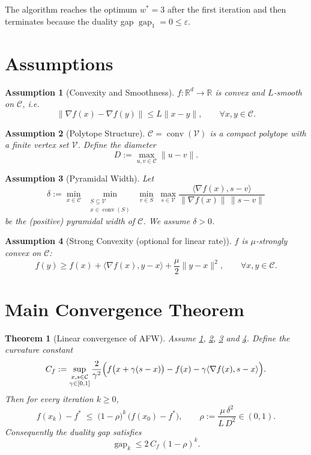 \documentclass{article}
\newtheorem{theorem}{Theorem}
\newtheorem{assumption}{Assumption}
\newcommand{\R}{\mathbb{R}}
\newcommand{\C}{\mathcal{C}}
\newcommand{\V}{\mathcal{V}}
\newcommand{\gap}{\operatorname{gap}}
\begin{document}
The algorithm reaches the optimum $w^{*}=3$ after the first iteration and then terminates because the duality gap $\gap_{1}=0\le\varepsilon$.

\section*{Assumptions}
\begin{assumption}[Convexity and Smoothness]\label{ass:conv-smooth}
$f:\R^{d}\rightarrow\R$ is convex and $L$‑smooth on $\C$, i.e.
\[
\|\nabla f(x)-\nabla f(y)\|\le L\|x-y\|,\qquad \forall x,y\in\C .
\]
\end{assumption}
\begin{assumption}[Polytope Structure]\label{ass:polytope}
$\C=\operatorname{conv}(\V)$ is a compact polytope with a finite vertex set $\V$.
Define the \emph{diameter}
\[
D:=\max_{u,v\in\C}\|u-v\| .
\]
\end{assumption}
\begin{assumption}[Pyramidal Width]\label{ass:pyr}
Let 
\[
\delta:=\min_{x\in\C}\;\min_{\substack{S\subseteq\V\\ x\in\operatorname{conv}(S)}}\;
\min_{v\in S}\;\max_{s\in\V}\frac{\langle \nabla f(x),s-v\rangle}{\|\nabla f(x)\|\,\|s-v\|}
\]
be the (positive) pyramidal width of $\C$. We assume $\delta>0$.
\end{assumption}
\begin{assumption}[Strong Convexity (optional for linear rate)]\label{ass:strong}
$f$ is $\mu$‑strongly convex on $\C$:
\[
f(y)\ge f(x)+\langle \nabla f(x),y-x\rangle+\frac{\mu}{2}\|y-x\|^{2},
\qquad\forall x,y\in\C .
\]
\end{assumption}

\section*{Main Convergence Theorem}
\begin{theorem}[Linear convergence of AFW]\label{thm:linear}
Assume \ref{ass:conv-smooth}, \ref{ass:polytope}, \ref{ass:pyr} and \ref{ass:strong}.
Define the curvature constant
\[
C_{f}:=\sup_{\substack{x,s\in\C\\ \gamma\in[0,1]}}
\frac{2}{\gamma^{2}}\Bigl(f\bigl(x+\gamma(s-x)\bigr)-f(x)-\gamma\langle \nabla f(x),s-x\rangle\Bigr).
\]
Then for every iteration $k\ge0$,
\[
f(x_{k})-f^{*}\;\le\;\bigl(1-\rho\bigr)^{k}\,\bigl(f(x_{0})-f^{*}\bigr),
\qquad 
\rho:=\frac{\mu\,\delta^{2}}{L\,D^{2}} \in(0,1).
\]
Consequently the duality gap satisfies 
\[
\gap_{k}\le 2\,C_{f}\,(1-\rho)^{k}.
\]
\end{theorem}
\end{document}
